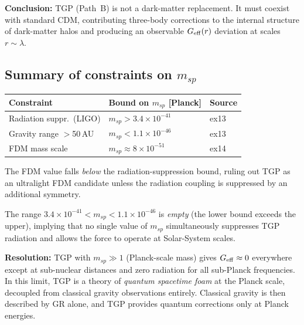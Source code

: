 \noindent
\textbf{Conclusion:} TGP (Path~B) is not a dark-matter replacement.
It must coexist with standard CDM, contributing three-body corrections
to the internal structure of dark-matter halos and producing an
observable $G_{\rm eff}(r)$ deviation at scales $r\sim\lambda$.

\subsection{Summary of constraints on $m_{sp}$}

\begin{center}
\begin{tabular}{lll}
\hline
Constraint & Bound on $m_{sp}$ [Planck] & Source \\
\hline
Radiation suppr.\ (LIGO) & $m_{sp}>3.4\times10^{-41}$ & ex13 \\
Gravity range $>$50\,AU  & $m_{sp}<1.1\times10^{-46}$ & ex13 \\
FDM mass scale           & $m_{sp}\approx8\times10^{-51}$ & ex14 \\
\hline
\end{tabular}
\end{center}

The FDM value falls \emph{below} the radiation-suppression bound,
ruling out TGP as an ultralight FDM candidate unless the radiation
coupling is suppressed by an additional symmetry.

The range $3.4\times10^{-41}<m_{sp}<1.1\times10^{-46}$ is
\emph{empty} (the lower bound exceeds the upper), implying that no
single value of $m_{sp}$ simultaneously suppresses TGP radiation and
allows the force to operate at Solar-System scales.

\textbf{Resolution:} TGP with $m_{sp}\gg 1$ (Planck-scale mass)
gives $G_{\rm eff}\approx0$ everywhere except at sub-nuclear
distances and zero radiation for all sub-Planck frequencies.  In
this limit, TGP is a theory of \emph{quantum spacetime foam} at the
Planck scale, decoupled from classical gravity observations entirely.
Classical gravity is then described by GR alone, and TGP provides
quantum corrections only at Planck energies.
